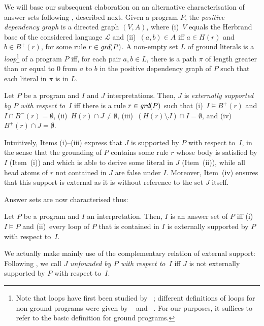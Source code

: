 \documentclass{tlp}
\renewcommand{\L}{\mathcal{L}}
\newcommand{\posbody}{B^{+}}
\newcommand{\negbody}{B^{-}}
\newcommand{\head}{H}
\newcommand{\grd}{\mathit{ground}}
\renewcommand{\grd}{\mathit{grd}}
\newcommand{\wrt}{with respect to}
\renewcommand{\mathit}[1]{{\text{\it{#1}}}}
\begin{document}
We will base our subsequent elaboration on an alternative characterisation of answer sets following , described next.
Given a program $P$,  the \emph{positive dependency graph} is a directed
graph $(V,A)$, where 
(i)~$V$ equals the Herbrand base of the considered language $\L$ and
(ii)~$(a,b) \in A$ iff $a \in \head(r)$ and $b \in \posbody(r)$, for some rule $r 
\in \grd(P)$.
A non-empty set $L$ of ground literals is  a \emph{loop}\footnote{Note that loops have first been studied by ~\citeyear{lin04}; different definitions of loops for non-ground programs were given by ~\citeyear{chen06} and ~\citeyear{lee08}.
For our purposes, it suffices to refer to the basic definition for ground programs.} of  a  program $P$ iff,
for each pair $a,b \in L$,
there is a path $\pi$ of length greater than or equal to 0 from $a$ to $b$
in the positive dependency graph of $P$ such that each literal in $\pi$
is in $L$. 

Let $P$ be a program and $I$ and $J$ interpretations. Then,
$J$ is \emph{externally supported by $P$ \wrt\ $I$} iff
there is a rule $r \in \grd(P)$ 
such that
(i)~$I\models\posbody(r)$ and $I\cap \negbody(r)=\emptyset$,
(ii)~$\head(r) \cap J \neq \emptyset$,
(iii)~$(\head(r)\setminus J)\cap I=\emptyset$, and
(iv)~$\posbody(r) \cap J = \emptyset$.

Intuitively, Items (i)--(iii) express that $J$ is supported by $P$ \wrt\ $I$, in the sense that the grounding of $P$ contains some rule $r$ whose body is satisfied by $I$ (Item~(i)) and which is able to derive some literal in $J$ (Item~(ii)), while all head atoms of $r$ not contained in $J$ are false under $I$.
Moreover, Item~(iv) ensures that this support is external as it is without
reference to the set $J$ itself.

Answer sets are now characterised thus:

\begin{proposition}\label{prop:lee05}
Let $P$ be a program and $I$ an interpretation. Then,
$I$ is an answer set of $P$ iff
{\rm (}i{\rm )}~$I \models P$ and
{\rm (}ii{\rm )}~every loop of $P$ that is contained in $I$ is externally supported by $P$ \wrt~$I$.
\end{proposition}

We actually make mainly use of the complementary relation of external support: Following , we call $J$ \emph{unfounded by $P$ \wrt\ $I$} iff $J$ is not externally supported by 
$P$ \wrt\ $I$. 
\end{document}
